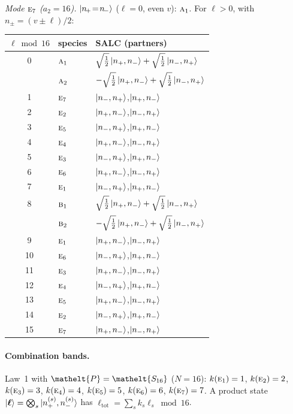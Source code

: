 \documentclass[11pt]{article}
\newcommand{\eltfont}[1]{{\let\sigma\eltsigma\mathelt{#1}}}
\newcommand{\irr}[1]{\text{\normalfont\scshape #1}}
\newcommand{\elt}[1]{\eltfont{#1}}
\newcommand{\pel}{\elt{P}}             %
\begin{document}
\emph{Mode $\irr{e}_{7}$ ($a_2=16$).} $\ket{n_{\!+}\!=\!n_{\!-}}$ ($\ell=0$, even $v$): $\irr{a}_{1}$. For $\ell>0$, with $n_\pm=(v\pm\ell)/2$:
\begin{longtable}{c l l}\hline $\ell\bmod 16$ & species & SALC (partners)\\ \hline\endhead
0 & $\irr{a}_{1}$ & $\sqrt{\tfrac{1}{2}}\ket{n_+,n_-}+\sqrt{\tfrac{1}{2}}\ket{n_-,n_+}$\\
 & $\irr{a}_{2}$ & $-\sqrt{\tfrac{1}{2}}\ket{n_+,n_-}+\sqrt{\tfrac{1}{2}}\ket{n_-,n_+}$\\
1 & $\irr{e}_{7}$ & $\ket{n_-,n_+}$,\quad $\ket{n_+,n_-}$\\
2 & $\irr{e}_{2}$ & $\ket{n_+,n_-}$,\quad $\ket{n_-,n_+}$\\
3 & $\irr{e}_{5}$ & $\ket{n_-,n_+}$,\quad $\ket{n_+,n_-}$\\
4 & $\irr{e}_{4}$ & $\ket{n_+,n_-}$,\quad $\ket{n_-,n_+}$\\
5 & $\irr{e}_{3}$ & $\ket{n_-,n_+}$,\quad $\ket{n_+,n_-}$\\
6 & $\irr{e}_{6}$ & $\ket{n_+,n_-}$,\quad $\ket{n_-,n_+}$\\
7 & $\irr{e}_{1}$ & $\ket{n_-,n_+}$,\quad $\ket{n_+,n_-}$\\
8 & $\irr{b}_{1}$ & $\sqrt{\tfrac{1}{2}}\ket{n_+,n_-}+\sqrt{\tfrac{1}{2}}\ket{n_-,n_+}$\\
 & $\irr{b}_{2}$ & $-\sqrt{\tfrac{1}{2}}\ket{n_+,n_-}+\sqrt{\tfrac{1}{2}}\ket{n_-,n_+}$\\
9 & $\irr{e}_{1}$ & $\ket{n_+,n_-}$,\quad $\ket{n_-,n_+}$\\
10 & $\irr{e}_{6}$ & $\ket{n_-,n_+}$,\quad $\ket{n_+,n_-}$\\
11 & $\irr{e}_{3}$ & $\ket{n_+,n_-}$,\quad $\ket{n_-,n_+}$\\
12 & $\irr{e}_{4}$ & $\ket{n_-,n_+}$,\quad $\ket{n_+,n_-}$\\
13 & $\irr{e}_{5}$ & $\ket{n_+,n_-}$,\quad $\ket{n_-,n_+}$\\
14 & $\irr{e}_{2}$ & $\ket{n_-,n_+}$,\quad $\ket{n_+,n_-}$\\
15 & $\irr{e}_{7}$ & $\ket{n_+,n_-}$,\quad $\ket{n_-,n_+}$\\
\hline\end{longtable}

\paragraph{Combination bands.}

Law~1 with $\pel=\elt{S_{16}}$ ($N=16$): $k(\irr{e}_{1})=1$, $k(\irr{e}_{2})=2$, $k(\irr{e}_{3})=3$, $k(\irr{e}_{4})=4$, $k(\irr{e}_{5})=5$, $k(\irr{e}_{6})=6$, $k(\irr{e}_{7})=7$. A product state $\ket{\boldsymbol\ell}=\bigotimes_s\ket{n_+^{(s)},n_-^{(s)}}$ has $\ell_{\mathrm{tot}}=\sum_sk_s\ell_s\bmod 16$.
\end{document}
